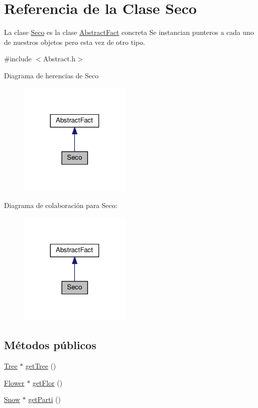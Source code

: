 \hypertarget{classSeco}{}\section{Referencia de la Clase Seco}
\label{classSeco}


La clase \hyperlink{classSeco}{Seco} es la clase \hyperlink{classAbstractFact}{Abstract\+Fact} concreta  Se instancian punteros a cada uno de nuestros objetos pero esta vez de otro tipo.  




{\ttfamily \#include $<$Abstract.\+h$>$}



Diagrama de herencias de Seco\nopagebreak
\begin{figure}[H]
\begin{center}
\leavevmode
\includegraphics[width=153pt]{classSeco__inherit__graph}
\end{center}
\end{figure}


Diagrama de colaboración para Seco\+:\nopagebreak
\begin{figure}[H]
\begin{center}
\leavevmode
\includegraphics[width=153pt]{classSeco__coll__graph}
\end{center}
\end{figure}
\subsection*{Métodos públicos}
\begin{DoxyCompactItemize}
\item 
\hyperlink{classTree}{Tree} $\ast$ \hyperlink{classSeco_ae4a078cccba29b3d89dcb62b6eeaa269}{get\+Tree} ()
\item 
\hyperlink{classFlower}{Flower} $\ast$ \hyperlink{classSeco_a91092401b16231a926255323e89c6412}{get\+Flor} ()
\item 
\hyperlink{classSnow}{Snow} $\ast$ \hyperlink{classSeco_acd61763141ecdb895062cdde7defa800}{get\+Parti} ()
\end{DoxyCompactItemize}


